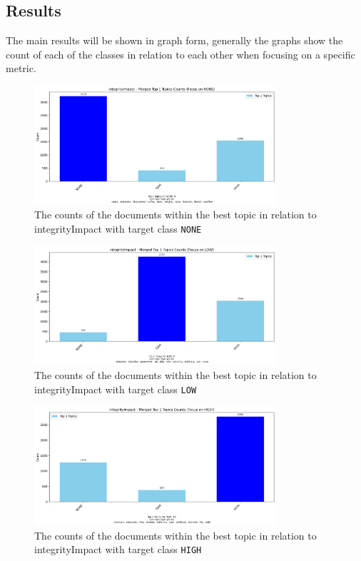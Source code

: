 \documentclass[12pt]{article}
\begin{document}
\subsection{Results}

The main results will be shown in graph form, generally the graphs show the count of each of the
classes in relation to each other when focusing on a specific metric.

\begin{figure}[h] \centering
	\includegraphics[width=0.8\textwidth]{figures/integrityImpact/merged_top_k_topics_category_focus_counts_integrityImpact_NONE_k1.png}
	\caption{\label{fig:integrityImpact_20_NONE}The counts of the documents within the best topic in
		relation to integrityImpact with target class \texttt{NONE}}
\end{figure}

\begin{figure}[h] \centering
	\includegraphics[width=0.8\textwidth]{figures/integrityImpact/merged_top_k_topics_category_focus_counts_integrityImpact_LOW_k1.png}
	\caption{\label{fig:integrityImpact_20_LOW}The counts of the documents within the best topic in
		relation to integrityImpact with target class \texttt{LOW}}
\end{figure}


\begin{figure}[h] \centering
	\includegraphics[width=0.8\textwidth]{figures/integrityImpact/merged_top_k_topics_category_focus_counts_integrityImpact_HIGH_k1.png}
	\caption{\label{fig:integrityImpact_20_HIGH}The counts of the documents within the best topic in
		relation to integrityImpact with target class \texttt{HIGH}}
\end{figure}
\end{document}

